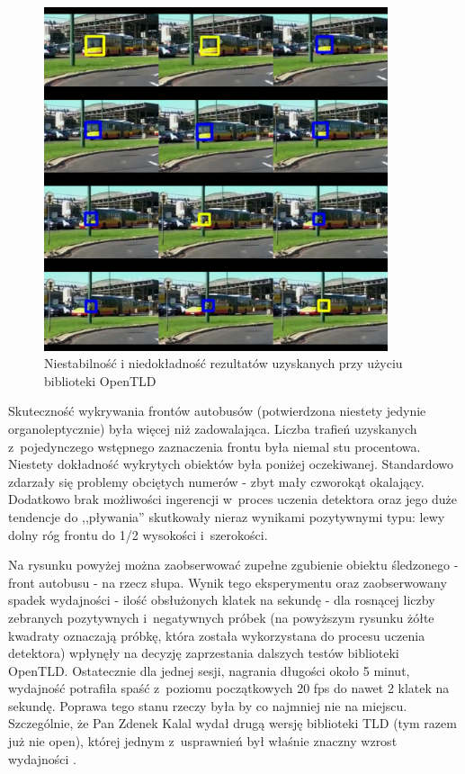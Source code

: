 \begin{figure}[h!]
    \caption{Niestabilność i niedokładność rezultatów uzyskanych przy
    użyciu biblioteki OpenTLD}
    \centering
    \includegraphics[width=0.9\textwidth]{img/exp_open_tld_fail}
\end{figure}

Skuteczność wykrywania frontów autobusów (potwierdzona 
niestety jedynie organoleptycznie) była więcej niż zadowalająca.
Liczba trafień uzyskanych z~pojedynczego wstępnego zaznaczenia frontu
była niemal stu procentowa. Niestety dokładność wykrytych obiektów
była poniżej oczekiwanej. Standardowo zdarzały się problemy
obciętych numerów - zbyt mały czworokąt okalający. Dodatkowo
brak możliwości ingerencji w~proces uczenia detektora oraz jego
duże tendencje do ,,pływania'' skutkowały nieraz wynikami pozytywnymi
typu: lewy dolny róg frontu do 1/2 wysokości i~szerokości. 

Na rysunku powyżej można zaobserwować zupełne zgubienie obiektu 
śledzonego - 
front autobusu - na rzecz słupa. Wynik tego eksperymentu oraz
zaobserwowany spadek wydajności - ilość obsłużonych klatek na sekundę - 
dla rosnącej liczby zebranych pozytywnych i~negatywnych próbek
(na powyższym rysunku żółte kwadraty oznaczają próbkę, która została
wykorzystana do procesu uczenia detektora) 
wpłynęły na decyzję zaprzestania dalszych testów biblioteki OpenTLD.
Ostatecznie dla jednej sesji,
nagrania długości około 5 minut, wydajność potrafiła spaść z~poziomu
początkowych 20 fps do nawet 2 klatek na sekundę. Poprawa tego stanu 
rzeczy była by co najmniej nie na miejscu. Szczególnie, że Pan 
Zdenek Kalal wydał drugą wersję biblioteki TLD (tym razem już nie 
open), której jednym z~usprawnień był właśnie znaczny wzrost wydajności
\cite{WEB:kalaltld2}.

